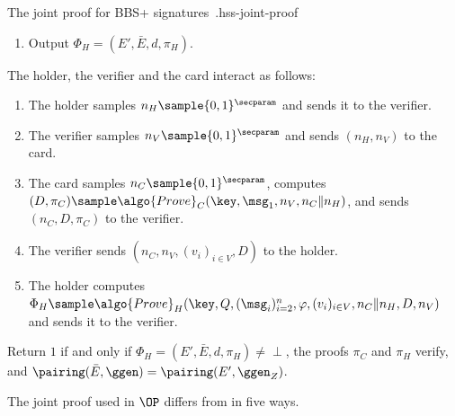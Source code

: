 \begin{primitivebox}[breakable]{The joint proof for BBS+ signatures~\cite{USENIX:HesSinSor23}.}{hss-joint-proof}
\begin{description}
\begin{enumerate}
	\item Output $\Phi_H = (E', \bar{E}, d, \pi_H)$.

      \end{enumerate}

    \item[Protocol :] The holder, the verifier and the card interact as
follows:

      \begin{enumerate}

	\item The holder samples $n_H \sample \{0,1\}^{\secparam}$ and sends it to
the verifier.

	\item The verifier samples $n_V \sample \{0,1\}^{\secparam}$ and sends
$(n_H, n_V)$ to the card.

	\item The card samples $n_C \sample \{0,1\}^{\secparam}$, computes $(D,
\pi_C) \sample \algo{Prove}_C(\key, \msg_1, n_V, n_C \| n_H)$, and sends $(n_C,
D, \pi_C)$ to the verifier.

	\item The verifier sends $(n_C, n_V, (v_i)_{i \in V}, D)$ to the holder.

	\item The holder computes $\Phi_H \sample \algo{Prove}_H(\key, Q,
(\msg_i)_{i=2}^{n}, \varphi, (v_i)_{i \in V}, n_C \| n_H, D, n_V)$ and sends it
to the verifier.

      \end{enumerate}

    \item[$\{0,1\} \leftarrow \algo{Verify}(\pk, (v_i)_{i \in V}, n_V, D,
\pi_C, \Phi_H)$ :] Return $1$ if and only if $\Phi_H = (E', \bar{E}, d, \pi_H)
\neq \perp$, the proofs $\pi_C$ and $\pi_H$ verify, and $\pairing(\bar{E},
\ggen) = \pairing(E', \ggen_Z)$.

  \end{description}

\end{primitivebox}

The joint proof used in $\OP$ differs from  in five
ways.

